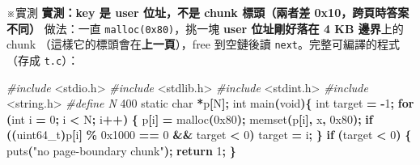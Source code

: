 \documentclass[10pt,a4paper]{article}
\newenvironment{Shaded}{\begin{snugshade}}{\end{snugshade}}
\newcommand{\BaseNTok}[1]{\textcolor[rgb]{0.00,0.00,0.81}{#1}}
\newcommand{\CharTok}[1]{\textcolor[rgb]{0.31,0.60,0.02}{#1}}
\newcommand{\ControlFlowTok}[1]{\textcolor[rgb]{0.13,0.29,0.53}{\textbf{#1}}}
\newcommand{\DataTypeTok}[1]{\textcolor[rgb]{0.13,0.29,0.53}{#1}}
\newcommand{\DecValTok}[1]{\textcolor[rgb]{0.00,0.00,0.81}{#1}}
\newcommand{\ImportTok}[1]{#1}
\newcommand{\NormalTok}[1]{#1}
\newcommand{\OperatorTok}[1]{\textcolor[rgb]{0.81,0.36,0.00}{\textbf{#1}}}
\newcommand{\PreprocessorTok}[1]{\textcolor[rgb]{0.56,0.35,0.01}{\textit{#1}}}
\newcommand{\StringTok}[1]{\textcolor[rgb]{0.31,0.60,0.02}{#1}}
\renewenvironment{Shaded}{%
  \def\FrameCommand{\fboxsep=3.2pt\colorbox{shadecolor}}%
  \MakeFramed{\advance\hsize-\width\FrameRestore\small}%
}{%
  \endMakeFramed
}
\renewenvironment{quote}{%
  \begin{mdframed}[linewidth=0pt,innerleftmargin=0pt,innerrightmargin=0pt,
    innerbottommargin=0pt,innertopmargin=0pt,skipabove=0.55em,skipbelow=0.55em,
    leftmargin=0.9em,rightmargin=0.4em,startcode={\color{quotebar}\vrule width 2.6pt},%
    endcode={}]%
  \itshape\color{black}%
}{%
  \end{mdframed}%
}
\begin{document}
\begin{quote}
※實測 \textbf{實測：key 是 user 位址，不是 chunk 標頭（兩者差
0x10，跨頁時答案不同）} 做法：一直 \texttt{malloc(0x80)}，挑一塊
\textbf{user 位址剛好落在 4 KB 邊界}上的 chunk
（這樣它的標頭會在\textbf{上一頁}），free 到空鏈後讀
\texttt{next}。完整可編譯的程式（存成 \texttt{t.\allowbreak{}c}）：

\begin{Shaded}
\begin{Highlighting}[]
\PreprocessorTok{\#include \textasciigrave{}}\ImportTok{\textless{}stdio.h\textgreater{}}\PreprocessorTok{\textasciigrave{}}
\PreprocessorTok{\#include \textasciigrave{}}\ImportTok{\textless{}stdlib.h\textgreater{}}\PreprocessorTok{\textasciigrave{}}
\PreprocessorTok{\#include \textasciigrave{}}\ImportTok{\textless{}stdint.h\textgreater{}}\PreprocessorTok{\textasciigrave{}}
\PreprocessorTok{\#include \textasciigrave{}}\ImportTok{\textless{}string.h\textgreater{}}\PreprocessorTok{\textasciigrave{}}
\PreprocessorTok{\#define N }\DecValTok{400}
\DataTypeTok{static} \DataTypeTok{char} \OperatorTok{*}\NormalTok{p}\OperatorTok{[}\NormalTok{N}\OperatorTok{];}
\DataTypeTok{int}\NormalTok{ main}\OperatorTok{(}\DataTypeTok{void}\OperatorTok{)\{}
    \DataTypeTok{int}\NormalTok{ target }\OperatorTok{=} \OperatorTok{{-}}\DecValTok{1}\OperatorTok{;}
    \ControlFlowTok{for} \OperatorTok{(}\DataTypeTok{int}\NormalTok{ i }\OperatorTok{=} \DecValTok{0}\OperatorTok{;}\NormalTok{ i }\OperatorTok{\textless{}}\NormalTok{ N}\OperatorTok{;}\NormalTok{ i}\OperatorTok{++)} \OperatorTok{\{}
\NormalTok{        p}\OperatorTok{[}\NormalTok{i}\OperatorTok{]} \OperatorTok{=}\NormalTok{ malloc}\OperatorTok{(}\BaseNTok{0x80}\OperatorTok{);}
\NormalTok{        memset}\OperatorTok{(}\NormalTok{p}\OperatorTok{[}\NormalTok{i}\OperatorTok{],} \CharTok{\textquotesingle{}x\textquotesingle{}}\OperatorTok{,} \BaseNTok{0x80}\OperatorTok{);}
        \ControlFlowTok{if} \OperatorTok{((}\DataTypeTok{uint64\_t}\OperatorTok{)}\NormalTok{p}\OperatorTok{[}\NormalTok{i}\OperatorTok{]} \OperatorTok{\%} \BaseNTok{0x1000} \OperatorTok{==} \DecValTok{0} \OperatorTok{\&\&}\NormalTok{ target }\OperatorTok{\textless{}} \DecValTok{0}\OperatorTok{)}\NormalTok{ target }\OperatorTok{=}\NormalTok{ i}\OperatorTok{;}
    \OperatorTok{\}}
    \ControlFlowTok{if} \OperatorTok{(}\NormalTok{target }\OperatorTok{\textless{}} \DecValTok{0}\OperatorTok{)} \OperatorTok{\{}\NormalTok{ puts}\OperatorTok{(}\StringTok{"no page{-}boundary chunk"}\OperatorTok{);} \ControlFlowTok{return} \DecValTok{1}\OperatorTok{;} \OperatorTok{\}}

\end{Highlighting}
\end{Shaded}
\end{quote}
\end{document}
